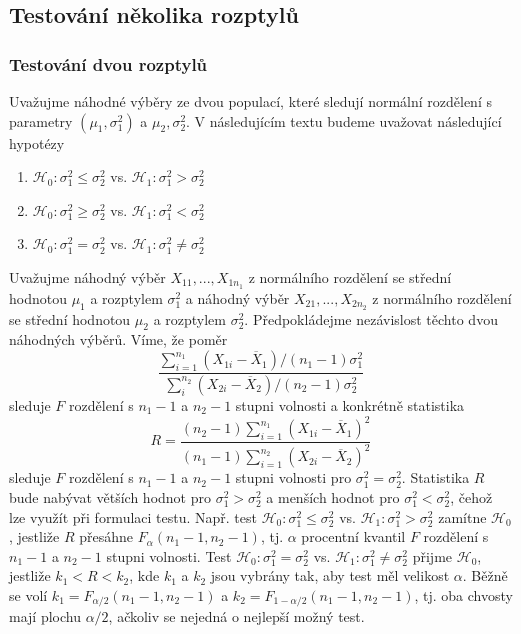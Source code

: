 \subsection{Testování několika rozptylů}

\subsubsection{Testování dvou rozptylů}

Uvažujme náhodné výběry ze dvou populací, které sledují normální rozdělení s parametry $(\mu_1, \sigma_1^2)$ a $\mu_2, \sigma_2^2$. V následujícím textu budeme uvažovat následující hypotézy
\begin{enumerate}
\item $\mathscr{H}_0: \sigma_1^2 \le \sigma_2^2$ vs. $\mathscr{H}_1: \sigma_1^2 > \sigma_2^2$
\item $\mathscr{H}_0: \sigma_1^2 \ge \sigma_2^2$ vs. $\mathscr{H}_1: \sigma_1^2 < \sigma_2^2$
\item $\mathscr{H}_0: \sigma_1^2 = \sigma_2^2$ vs. $\mathscr{H}_1: \sigma_1^2 \neq \sigma_2^2$
\end{enumerate}
Uvažujme náhodný výběr  $X_{11}, ..., X_{1n_1}$ z normálního rozdělení se střední hodnotou $\mu_1$ a rozptylem $\sigma_1^2$ a náhodný výběr  $X_{21}, ..., X_{2n_2}$ z normálního rozdělení se střední hodnotou $\mu_2$ a rozptylem $\sigma_2^2$. Předpokládejme nezávislost těchto dvou náhodných výběrů. Víme, že poměr
\begin{equation*}
\frac{\sum_{i = 1}^{n_1}(X_{1i} - \overline{X}_1)/(n_1 - 1)\sigma_1^2}{\sum_{i}^{n_2}(X_{2i} - \overline{X}_2)/(n_2 - 1)\sigma_2^2}
\end{equation*}
sleduje $F$ rozdělení s $n_1 - 1$ a $n_2 - 1$ stupni volnosti a konkrétně statistika
\begin{equation*}
R = \frac{(n_2 - 1)\sum_{i = 1}^{n_1}(X_{1i} - \overline{X}_1)^2}{(n_1 - 1)\sum_{i = 1}^{n_2}(X_{2i} - \overline{X}_2)^2}
\end{equation*}
sleduje $F$ rozdělení s $n_1 - 1$ a $n_2 - 1$ stupni volnosti pro $\sigma_1^2 = \sigma_2^2$. Statistika $R$ bude nabývat větších hodnot pro $\sigma_1^2 > \sigma_2^2$ a menších hodnot pro $\sigma_1^2 < \sigma_2^2$, čehož lze využít při formulaci testu. Např. test $\mathscr{H}_0: \sigma_1^2 \le \sigma_2^2$ vs. $\mathscr{H}_1: \sigma_1^2 > \sigma_2^2$ zamítne $\mathscr{H}_0$, jestliže $R$ přesáhne $F_{\alpha}(n_1 - 1, n_2 - 1)$, tj. $\alpha$ procentní kvantil $F$ rozdělení s $n_1 - 1$ a $n_2 - 1$ stupni volnosti. Test $\mathscr{H}_0: \sigma_1^2 = \sigma_2^2$ vs. $\mathscr{H}_1: \sigma_1^2 \neq \sigma_2^2$ přijme $\mathscr{H}_0$, jestliže $k_1 < R < k_2$, kde $k_1$ a $k_2$ jsou vybrány tak, aby test měl velikost $\alpha$. Běžně se volí $k_1 = F_{\alpha/2}(n_1 - 1, n_2 - 1)$ a $k_2 =  F_{1 - \alpha/2}(n_1 - 1, n_2 - 1)$, tj. oba chvosty mají plochu $\alpha/2$, ačkoliv se nejedná o nejlepší možný test.

